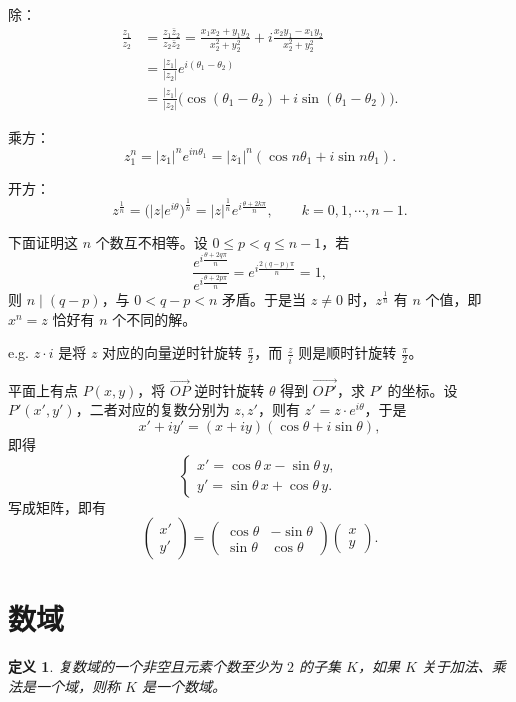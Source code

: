 \documentclass[UTF8,11pt]{ctexart}
\theoremstyle{cnthm}
\newtheorem{defn}[thm]{定义}
\begin{document}
除：
\[
\begin{aligned}
\frac{z_1}{z_2}&=\frac{z_1\bar{z}_2}{z_2\bar{z}_2}
=\frac{x_1x_2+y_1y_2}{x_2^2+y_2^2}+i\frac{x_2y_1-x_1y_2}{x_2^2+y_2^2}\\
&=\frac{|z_1|}{|z_2|}e^{i(\theta_1-\theta_2)}\\
&=\frac{|z_1|}{|z_2|}\bigl(\cos(\theta_1-\theta_2)+i\sin(\theta_1-\theta_2)\bigr).
\end{aligned}
\]

乘方：
\[
z_1^n=|z_1|^ne^{in\theta_1}=|z_1|^n(\cos n\theta_1+i\sin n\theta_1).
\]

开方：
\[
z^{\frac{1}{n}}=\bigl(|z|e^{i\theta}\bigr)^{\frac{1}{n}}
=|z|^{\frac{1}{n}}e^{i\frac{\theta+2k\pi}{n}},
\qquad k=0,1,\cdots,n-1.
\]

下面证明这 $n$ 个数互不相等。设 $0\le p<q\le n-1$，若
\[
\frac{e^{i\frac{\theta+2q\pi}{n}}}{e^{i\frac{\theta+2p\pi}{n}}}
=e^{i\frac{2(q-p)\pi}{n}}=1,
\]
则 $n\mid(q-p)$，与 $0<q-p<n$ 矛盾。于是当 $z\neq0$ 时，$z^{\frac{1}{n}}$ 有 $n$ 个值，即 $x^n=z$ 恰好有 $n$ 个不同的解。

e.g. $z\cdot i$ 是将 $z$ 对应的向量逆时针旋转 $\frac{\pi}{2}$，而 $\frac{z}{i}$ 则是顺时针旋转 $\frac{\pi}{2}$。

平面上有点 $P(x,y)$，将 $\overrightarrow{OP}$ 逆时针旋转 $\theta$ 得到 $\overrightarrow{OP'}$，求 $P'$ 的坐标。设 $P'(x',y')$，二者对应的复数分别为 $z,z'$，则有 $z'=z\cdot e^{i\theta}$，于是
\[
x'+iy'=(x+iy)(\cos\theta+i\sin\theta),
\]
即得
\[
\begin{cases}
x'=\cos\theta\,x-\sin\theta\,y,\\
y'=\sin\theta\,x+\cos\theta\,y.
\end{cases}
\]
写成矩阵，即有
\[
\begin{pmatrix}x'\\y'\end{pmatrix}
=
\begin{pmatrix}\cos\theta & -\sin\theta\\ \sin\theta & \cos\theta\end{pmatrix}
\begin{pmatrix}x\\y\end{pmatrix}.
\]

\section{数域}

\begin{defn}
复数域的一个非空且元素个数至少为 $2$ 的子集 $K$，如果 $K$ 关于加法、乘法是一个域，则称 $K$ 是一个数域。
\end{defn}
\end{document}
